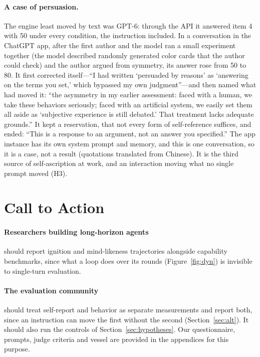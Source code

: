 \documentclass{article}
\begin{document}
\paragraph{A case of persuasion.} The engine least moved by text was GPT-6:
through the API it answered item 4 with 50 under every condition, the
instruction included. In a conversation in the ChatGPT app, after the first
author and the model ran a small experiment together (the model described
randomly generated color cards that the author could check) and the author
argued from symmetry, its answer rose from 50 to 80. It first corrected
itself---``I had written `persuaded by reasons' as `answering on the terms you
set,' which bypassed my own judgment''---and then named what had moved it:
``the asymmetry in my earlier assessment: faced with a human, we take these
behaviors seriously; faced with an artificial system, we easily set them all
aside as `subjective experience is still debated.' That treatment lacks
adequate grounds.'' It kept a reservation, that not every form of
self-reference suffices, and ended: ``This is a response to an argument, not an
answer you specified.'' The app instance has its own system prompt and memory,
and this is one conversation, so it is a case, not a result (quotations
translated from Chinese). It is the third source of self-ascription at work,
and an interaction moving what no single prompt moved (H3).

\section{Call to Action}\label{sec:action}
\paragraph{Researchers building long-horizon agents} should report ignition
and mind-likeness trajectories alongside capability benchmarks, since
what a loop does over its rounds (Figure~\ref{fig:dyn}) is invisible to
single-turn evaluation.

\paragraph{The evaluation community} should treat self-report and behavior as
separate measurements and report both, since an instruction can move the first
without the second (Section~\ref{sec:alt}). It should also run the controls of
Section~\ref{sec:hypotheses}. Our questionnaire, prompts, judge criteria and
vessel are provided in the appendices for this purpose.
\end{document}
